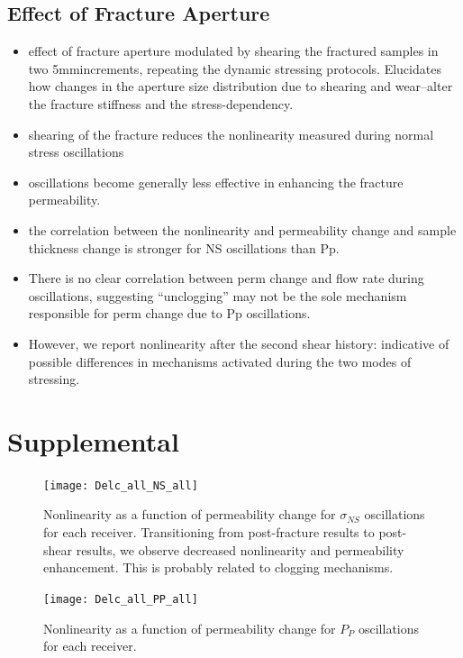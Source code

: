\documentclass[letterpaper,10pt]{article}
\begin{document}
\newpage

\subsection{Effect of Fracture Aperture}
\begin{itemize}
	\item effect of fracture aperture modulated by shearing the fractured samples in two 5mmincrements, repeating the dynamic stressing protocols. Elucidates how changes in the aperture size distribution due to shearing and wear–alter the fracture stiffness and the stress-dependency.
	\item shearing of the fracture reduces the nonlinearity measured during normal stress oscillations
	\item oscillations become generally less effective in enhancing the fracture permeability.
	\item the correlation between the nonlinearity and permeability change and sample thickness change is stronger for NS oscillations than Pp. 
	\item There is no clear correlation between perm change and flow rate during oscillations, suggesting “unclogging” may not be the sole mechanism responsible for perm change due to Pp oscillations. 
	\item However, we report nonlinearity after the second shear history: indicative of possible differences in mechanisms activated during the two modes of stressing.
\end{itemize}

\newpage

\section{Supplemental}
\begin{figure}[ht]
	\centering
	\texttt{[image: Delc\_all\_NS\_all]}
	\caption{Nonlinearity as a function of permeability change for $ \sigma_{NS} $ oscillations for each receiver. Transitioning from post-fracture results to post-shear results, we observe decreased nonlinearity and permeability enhancement. This is probably related to clogging mechanisms.}%
	\label{fig:delc_plots}
\end{figure}

\newpage

\begin{figure}[ht]
	\centering
	\texttt{[image: Delc\_all\_PP\_all]}
	\caption{Nonlinearity as a function of permeability change for $ P_P $ oscillations for each receiver.}
	\label{fig:delc_plots2}
\end{figure}

\newpage

\end{document}
